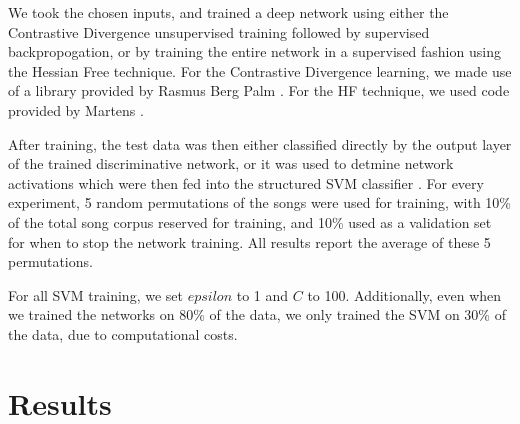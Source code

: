 \documentclass{article}
\begin{document}
We took the chosen inputs, and trained a deep network using either the
Contrastive Divergence unsupervised training followed by supervised
backpropogation, or by training the entire network in a supervised fashion
using the Hessian Free technique. For the Contrastive Divergence learning, we
made use of a library provided by Rasmus Berg Palm \cite{IMM2012-06284}. For
the HF technique, we used code provided by Martens \cite{martens2010deep}.

After training, the test data was then either classified directly by the output
layer of the trained discriminative network, or it was used to detmine network
activations which were then fed into the structured SVM classifier
\cite{joachims1999making}. For every experiment, 5 random permutations of the
songs were used for training, with 10\% of the total song corpus reserved for
training, and 10\% used as a validation set for when to stop the network
training. All results report the average of these 5 permutations.

For all SVM training, we set $epsilon$ to 1 and $C$ to 100. Additionally,
even when we trained the networks on 80\% of the data, we only trained the
SVM on 30\% of the data, due to computational costs.

\section{Results}



\end{document}
